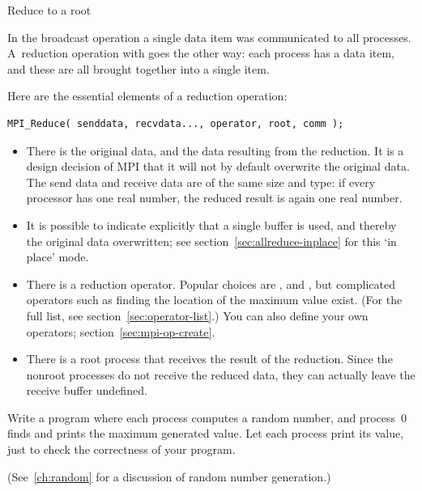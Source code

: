  {Reduce to a root}
\label{sec:reduce-root}

In the broadcast operation a single data item was communicated to all
processes. A~reduction operation with
%
%
goes the other way: each process has a
data item, and these are all brought together into a single item.

Here are the essential elements of a reduction operation:
\begin{lstlisting}
MPI_Reduce( senddata, recvdata..., operator, root, comm ); 
\end{lstlisting}
\begin{itemize}
\item There is the original data, and the data resulting from the
  reduction. It is a design decision of MPI that it will not by
  default overwrite the original data. The send data and receive data
  are of the same size and type: if every processor has one real
  number, the reduced result is again one real number.
\item It is possible to indicate explicitly that a single buffer
  is used, and thereby the original data overwritten;
  see section~\ref{sec:allreduce-inplace} for this `in place' mode.
\item There is a reduction operator. Popular choices are
  ,  and
  , but complicated operators such as finding
  the location of the maximum value exist.
  (For the full list, see section~\ref{sec:operator-list}.)
  You can also define your
  own operators; section~\ref{sec:mpi-op-create}.
\item There is a root process that receives the result of the
  reduction. Since the nonroot processes do not receive the reduced
  data, they can actually leave the receive buffer undefined.
\end{itemize}


\begin{exercise}
  \label{ex:randommax}
  Write a program where each process computes a random number, and process~0
  finds and prints the maximum generated value. Let each process print its value,
  just to check the correctness of your program.
\begin{book}
  (See~\ref{ch:random} for a discussion of random number generation.)
\end{book}
\end{exercise}

